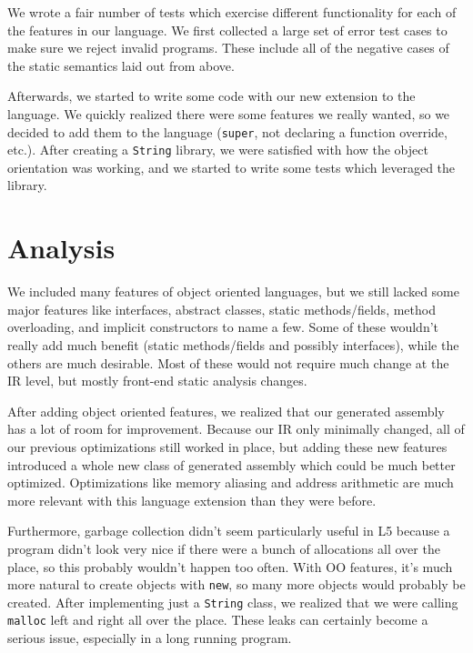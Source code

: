 \documentclass{article}
\begin{document}
We wrote a fair number of tests which exercise different
functionality for each of the features in our language. We first collected a
large set of error test cases to make sure we reject invalid programs. These
include all of the negative cases of the static semantics laid out from above.

Afterwards, we started to write some code with our new extension to the
language. We quickly realized there were some features we really wanted, so we
decided to add them to the language (\texttt{super}, not declaring a function
override, etc.). After creating a \texttt{String} library, we were satisfied
with how the object orientation was working, and we started to write some tests
which leveraged the library.

\section{Analysis}

We included many features of object oriented languages, but we still lacked some
major features like interfaces, abstract classes, static methods/fields, method
overloading, and implicit constructors to name a few. Some of these wouldn't
really add much benefit (static methods/fields and possibly interfaces), while
the others are much desirable. Most of these would not require much change at
the IR level, but mostly front-end static analysis changes.

After adding object oriented features, we realized that our generated assembly
has a lot of room for improvement. Because our IR only minimally changed, all of
our previous optimizations still worked in place, but adding these new features
introduced a whole new class of generated assembly which could be much better
optimized. Optimizations like memory aliasing and address arithmetic are much
more relevant with this language extension than they were before.

Furthermore, garbage collection didn't seem particularly useful in L5 because
a program didn't look very nice if there were a bunch of allocations all over
the place, so this probably wouldn't happen too often. With OO features, it's
much more natural to create objects with \texttt{new}, so many more objects
would probably be created. After implementing just a \texttt{String} class, we
realized that we were calling \texttt{malloc} left and right all over the place.
These leaks can certainly become a serious issue, especially in a long running
program.
\end{document}
